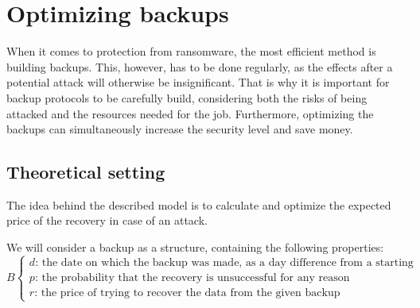 \documentclass[11pt, a4paper]{article}
\theoremstyle{definition}
\begin{document}
\section{Optimizing backups}
	When it comes to protection from ransomware, the most efficient method is building backups. This, however, has to be done regularly, as the effects after a potential attack will otherwise be insignificant. That is why it is important for backup protocols to be carefully build, considering both the risks of being attacked and the resources needed for the job. Furthermore, optimizing the backups can simultaneously increase the security level and save money.
	\subsection{Theoretical setting}
		The idea behind the described model is to calculate and optimize the expected price of the recovery in case of an attack.\par
		We will consider a backup as a structure, containing the following properties:
		$$
		B
		\begin{cases}
			d \text{: the date on which the backup was made, as a day difference from a starting point}\\
			p \text{: the probability that the recovery is unsuccessful for any reason}\\
			r \text{: the price of trying to recover the data from the given backup}
		\end{cases}
		$$
		
\end{document}
